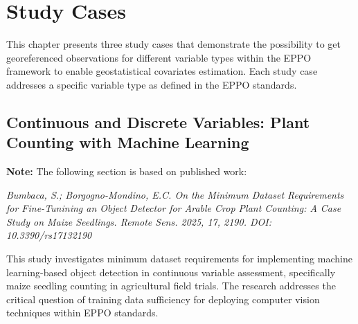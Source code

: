 \documentclass[12pt,a4paper,oneside]{report}
\begin{document}
\chapter{Study Cases}

This chapter presents three study cases that demonstrate the possibility to get 
georeferenced observations for different variable types within the EPPO framework
to enable geostatistical covariates estimation. 
Each study case addresses a specific variable type as defined in the EPPO standards.

\section{Continuous and Discrete Variables: Plant Counting with Machine Learning}

\textbf{Note:} The following section is based on published work:

\textit{Bumbaca, S.; Borgogno-Mondino, E.C. On the Minimum Dataset Requirements for Fine-Tunining an Object Detector for Arable Crop Plant Counting: A Case Study on Maize Seedlings. Remote Sens. 2025, 17, 2190. DOI: 10.3390/rs17132190}

This study investigates minimum dataset requirements for implementing machine learning-based object detection in continuous variable assessment, specifically maize seedling counting in agricultural field trials. The research addresses the critical question of training data sufficiency for deploying computer vision techniques within EPPO standards.



% 
% 
% 
% 
% 
% 
% 
% 
% 
% 
% 
% 
% 
\end{document}
